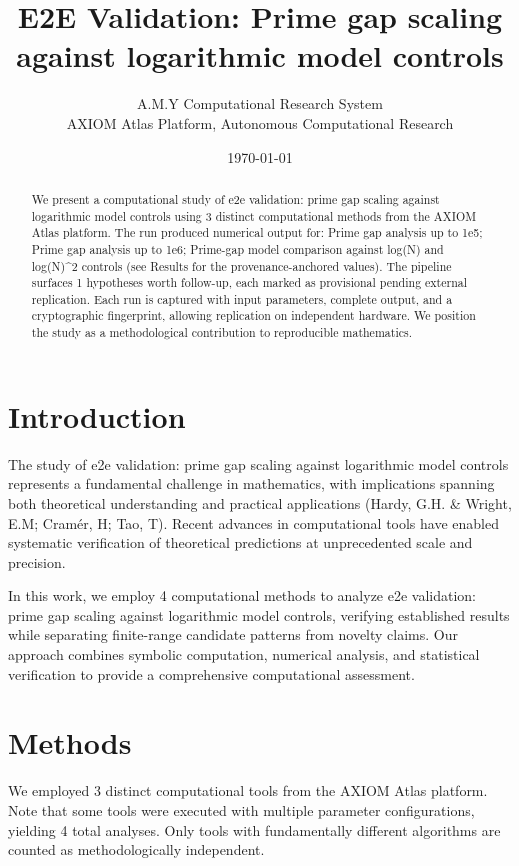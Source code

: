 \documentclass[11pt,a4paper]{article}
\title{E2E Validation: Prime gap scaling against logarithmic model controls}
\author{A.M.Y Computational Research System\\
\small AXIOM Atlas Platform, Autonomous Computational Research}
\date{\today}
\begin{document}
\maketitle

\begin{abstract}
We present a computational study of e2e validation: prime gap scaling against logarithmic model controls using 3 distinct computational methods from the AXIOM Atlas platform. The run produced numerical output for: Prime gap analysis up to 1e5; Prime gap analysis up to 1e6; Prime-gap model comparison against log(N) and log(N)\textasciicircum{}2 controls (see Results for the provenance-anchored values). The pipeline surfaces 1 hypotheses worth follow-up, each marked as provisional pending external replication. Each run is captured with input parameters, complete output, and a cryptographic fingerprint, allowing replication on independent hardware. We position the study as a methodological contribution to reproducible mathematics.
\end{abstract}

\section{Introduction}
The study of e2e validation: prime gap scaling against logarithmic model controls represents a fundamental challenge in mathematics, with implications spanning both theoretical understanding and practical applications (Hardy, G.H. \& Wright, E.M; Cramér, H; Tao, T). Recent advances in computational tools have enabled systematic verification of theoretical predictions at unprecedented scale and precision.

In this work, we employ 4 computational methods to analyze e2e validation: prime gap scaling against logarithmic model controls, verifying established results while separating finite-range candidate patterns from novelty claims. Our approach combines symbolic computation, numerical analysis, and statistical verification to provide a comprehensive computational assessment.


\section{Methods}
We employed 3 distinct computational tools from the AXIOM Atlas platform. Note that some tools were executed with multiple parameter configurations, yielding 4 total analyses. Only tools with fundamentally different algorithms are counted as methodologically independent.
\end{document}
